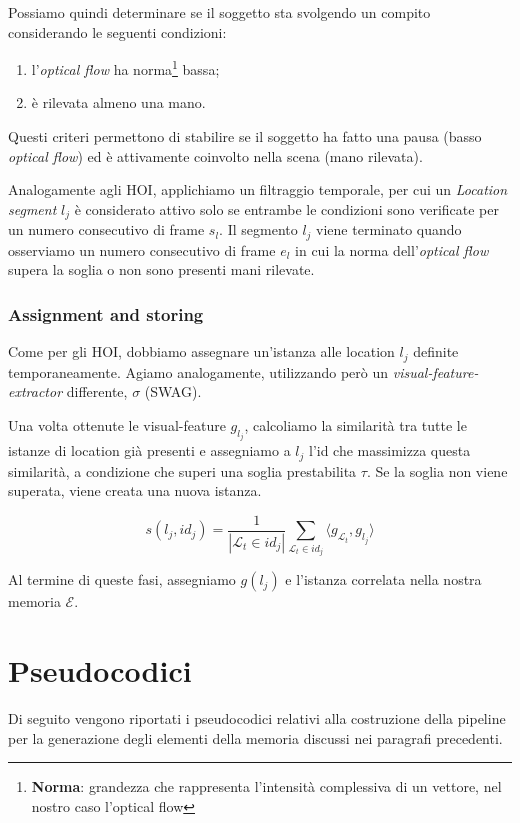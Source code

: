 Possiamo quindi determinare se il soggetto sta svolgendo un compito considerando le seguenti condizioni:
\begin{enumerate}
    \item l'\emph{optical flow} ha norma\footnote{\textbf{Norma}: grandezza che rappresenta l'intensità complessiva di un vettore, nel nostro caso l'optical flow} bassa;
    \item è rilevata almeno una mano.
\end{enumerate}
Questi criteri permettono di stabilire se il soggetto ha fatto una pausa (basso \emph{optical flow}) ed è attivamente coinvolto nella scena (mano rilevata).

Analogamente agli HOI, applichiamo un filtraggio temporale, per cui un \emph{Location segment} $l_j$ è considerato attivo solo se entrambe le condizioni sono verificate per un numero consecutivo di frame $s_l$. Il segmento $l_j$ viene terminato quando osserviamo un numero consecutivo di frame $e_l$ in cui la norma dell'\emph{optical flow} supera la soglia o non sono presenti mani rilevate.

\subsubsection*{Assignment and storing}
Come per gli HOI, dobbiamo assegnare un'istanza alle location $l_j$ definite temporaneamente. Agiamo analogamente, utilizzando però un \emph{visual-feature-extractor} differente, $\sigma$ (SWAG)\cite{singh2022revisitingweaklysupervisedpretraining}.

Una volta ottenute le visual-feature $g_{l_j}$, calcoliamo la similarità tra tutte le istanze di location già presenti e assegniamo a $l_j$ l'id che massimizza questa similarità, a condizione che superi una soglia prestabilita $\tau$. Se la soglia non viene superata, viene creata una nuova istanza.

\[
s(l_j, id_j) = \frac{1}{|\mathcal{L}_t \in id_j|} \sum_{\mathcal{L}_t \in id_j} \langle g_{\mathcal{L}_t}, g_{l_j} \rangle
\]

Al termine di queste fasi, assegniamo $g(l_j)$ e l'istanza correlata nella nostra memoria $\mathcal{E}$.

\section{Pseudocodici}

Di seguito vengono riportati i pseudocodici relativi alla costruzione della pipeline per la generazione degli elementi della memoria discussi nei paragrafi precedenti.

